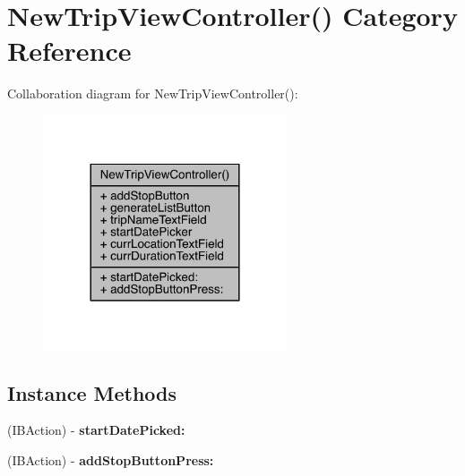 \hypertarget{category_new_trip_view_controller_07_08}{\section{New\-Trip\-View\-Controller() Category Reference}
\label{category_new_trip_view_controller_07_08}
}


Collaboration diagram for New\-Trip\-View\-Controller()\-:\nopagebreak
\begin{figure}[H]
\begin{center}
\leavevmode
\includegraphics[width=204pt]{category_new_trip_view_controller_07_08__coll__graph}
\end{center}
\end{figure}
\subsection*{Instance Methods}
\begin{DoxyCompactItemize}
\item 
\hypertarget{category_new_trip_view_controller_07_08_a13a1e787f7bba2412b8254a2c5552863}{(I\-B\-Action) -\/ {\bfseries start\-Date\-Picked\-:}}\label{category_new_trip_view_controller_07_08_a13a1e787f7bba2412b8254a2c5552863}

\item 
\hypertarget{category_new_trip_view_controller_07_08_ad2bc2e48e85627ef5d02f21569694c15}{(I\-B\-Action) -\/ {\bfseries add\-Stop\-Button\-Press\-:}}\label{category_new_trip_view_controller_07_08_ad2bc2e48e85627ef5d02f21569694c15}

\end{DoxyCompactItemize}

